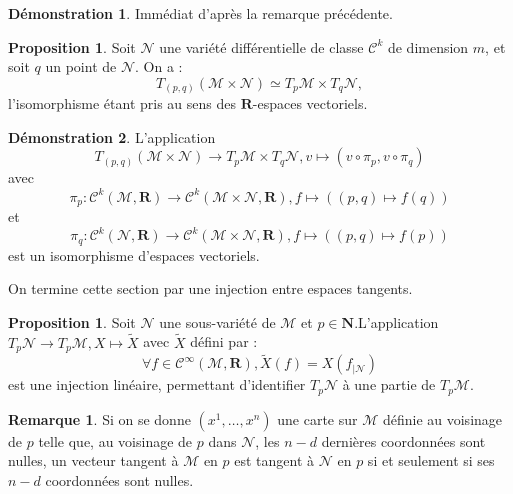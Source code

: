 \documentclass[12pt,a4paper]{article}
\theoremstyle{definition}
\newtheorem{prop}[thm]{Proposition}
\newtheorem{rqe}[thm]{Remarque}
\newtheorem*{dem}{Démonstration}
\begin{document}
\begin{dem}
Immédiat d'après la remarque précédente.
\end{dem}
\begin{prop}
Soit $\mathcal{N}$ une variété différentielle de classe $\mathcal{C}^k$ de dimension $m$, et soit $q$ un point de $\mathcal{N}$. On a :
$$
T_{(p,q)}(\mathcal{M}\times\mathcal{N})\simeq T_p\mathcal{M}\times T_q\mathcal{N},
$$
l'isomorphisme étant pris au sens des $\mathbf{R}$-espaces vectoriels.
\end{prop}
\begin{dem}
L'application
$$T_{(p,q)}(\mathcal{M}\times\mathcal{N})\to T_p\mathcal{M}\times T_q\mathcal{N},v\mapsto (v\circ\pi_p,v\circ\pi_q)$$ avec $$\pi_p:\mathcal{C}^k(\mathcal{M},\mathbf{R})\to\mathcal{C}^k(\mathcal{M}\times\mathcal{N},\mathbf{R}),f\mapsto ((p,q)\mapsto f(q))$$ et $$\pi_q:\mathcal{C}^k(\mathcal{N},\mathbf{R})\to\mathcal{C}^k(\mathcal{M}\times\mathcal{N},\mathbf{R}),f\mapsto ((p,q)\mapsto f(p))$$
est un isomorphisme d'espaces vectoriels.
\end{dem}
On termine cette section par une injection entre espaces tangents.
\begin{prop}
Soit $\mathcal{N}$ une sous-variété de $\mathcal{M}$ et $p\in\mathbf{N}$.\newline L'application $T_p\mathcal{N}\to T_p\mathcal{M},X\mapsto\widetilde{X}$ avec $\widetilde{X}$ défini par :
$$\forall f\in\mathcal{C}^\infty(\mathcal{M},\mathbf{R}), \widetilde{X}(f)=X(f_{|\mathcal{N}})$$
est une injection linéaire, permettant d'identifier $T_p\mathcal{N}$ à une partie de $T_p\mathcal{M}$.
\end{prop}
\begin{rqe}
Si on se donne $(x^1,\ldots,x^n)$ une carte sur $\mathcal{M}$ définie au voisinage de $p$ telle que, au voisinage de $p$ dans $\mathcal{N}$, les $n-d$ dernières coordonnées sont nulles, un vecteur tangent à $\mathcal{M}$ en $p$ est tangent à $\mathcal{N}$ en $p$ si et seulement si ses $n-d$ coordonnées sont nulles.
\end{rqe}
\newpage
\end{document}
